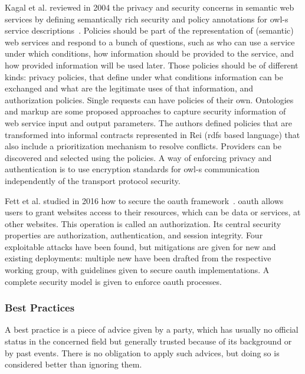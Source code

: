 Kagal et al. reviewed in 2004 the privacy and security concerns in semantic web services by defining semantically rich security and policy annotations for \gls{owl-s} service descriptions~\cite{kagal_authorization_2004}. Policies should be part of the representation of (semantic) web services and respond to a bunch of questions, such as who can use a service under which conditions, how information should be provided to the service, and how provided information will be used later. Those policies should be of different kinds: privacy policies, that define under what conditions information can be exchanged and what are the legitimate uses of that information, and authorization policies. Single requests can have policies of their own. Ontologies and markup are some proposed approaches to capture security information of web service input and output parameters. The authors defined policies that are transformed into informal contracts represented in Rei (\gls{rdfs} based language) that also include a prioritization mechanism to resolve conflicts. Providers can be discovered and selected using the policies. A way of enforcing privacy and authentication is to use encryption standards for \gls{owl-s} communication independently of the transport protocol security. %

Fett et al. studied in 2016 how to secure the \gls{oauth} \gls{framework}~\cite{fett_comprehensive_2016}. \gls{oauth} allows users to grant websites access to their resources, which can be data or services, at other websites. This operation is called an authorization. Its central security properties are authorization, authentication, and session integrity. Four exploitable attacks have been found, but mitigations are given for new and existing deployments: multiple new  have been drafted from the respective working group, with guidelines given to secure \gls{oauth} implementations. A complete security model is given to enforce \gls{oauth} processes. %

\subsubsection{Best Practices}
\label{subsubsec:state_review_results_bestpractices}

A best practice is a piece of advice given by a party, which has usually no official status in the concerned field but generally trusted because of its background or by past events. There is no obligation to apply such advices, but doing so is considered better than ignoring them.

